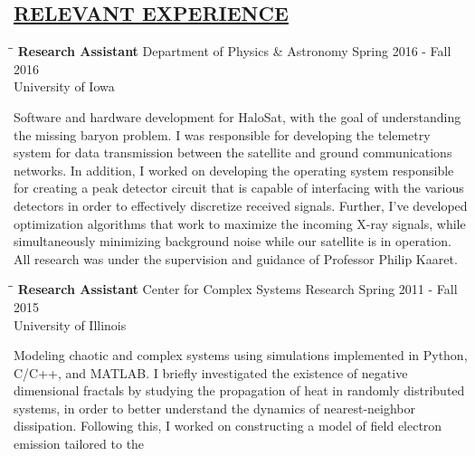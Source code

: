 \documentclass{res}
\begin{document}
\begin{resume}
\section{\underline{RELEVANT EXPERIENCE}}
\vspace{1.5mm}
   \begin{tabbing}
   \hspace{1.75in}\= \hspace{2.75in}\= \kill %
    {\bf Research Assistant} \> Department of Physics \& Astronomy\> Spring
        2016 - Fall 2016\\ \> University of Iowa
   \end{tabbing}\vspace{-18pt}      %
        Software and hardware development for HaloSat, with the goal of
        understanding the missing baryon problem. I was responsible for
        developing the telemetry system for data transmission between the
        satellite and ground communications networks. In addition, I worked on
        developing the operating system responsible for creating a peak
        detector circuit that is capable of interfacing with the various
        detectors in order to effectively discretize received signals. Further,
        I've developed optimization algorithms that work to maximize the
        incoming X-ray signals, while simultaneously minimizing background
        noise while our satellite is in operation. All research was under
        the supervision and guidance of Professor Philip Kaaret.
   \vspace{-1mm}
   \begin{tabbing}
   \hspace{1.75in}\= \hspace{2.75in}\= \kill %
    {\bf Research Assistant} \>Center for Complex Systems Research \> Spring
        2011 - Fall 2015\\ \>University of Illinois
   \end{tabbing}\vspace{-18pt}      %
        Modeling chaotic and complex systems using simulations implemented in
        Python, C/C++, and MATLAB.  I briefly investigated the existence of
        negative dimensional fractals by studying the propagation of heat in
        randomly distributed systems, in order to better understand the
        dynamics of nearest-neighbor dissipation. Following this, I worked on
        constructing a model of field electron emission tailored to the

\end{resume}
\end{document}
